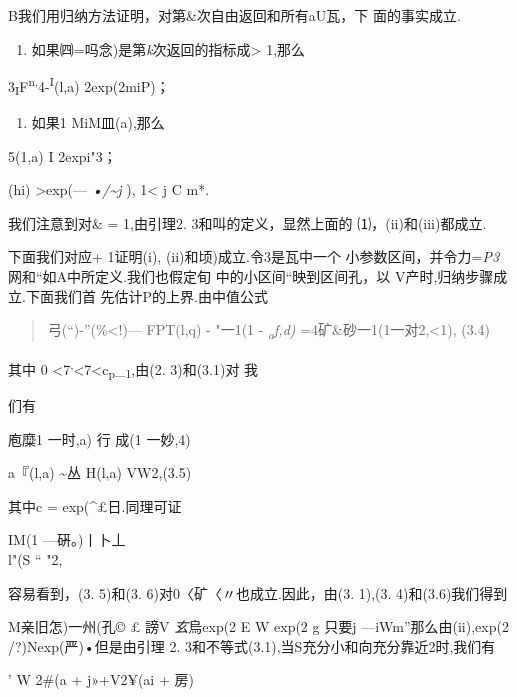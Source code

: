 \documentclass{article}
\begin{document}
B我们用归纳方法证明，对第\&次自由返回和所有aU瓦，下 面的事实成立.

\begin{enumerate}
\def\labelenumi{(\roman{enumi})}
\item
  如果㈣=吗念)是第\emph{k}次返回的指标成\textgreater{} 1,那么
\end{enumerate}

\textbar{}3\textsubscript{I}F\textsuperscript{n,}4-\textsuperscript{I}(l,a)\textbar{}
2exp(2miP)；

\begin{enumerate}
\def\labelenumi{(\roman{enumi})}
\setcounter{enumi}{1}
\item
  如果1 MiM皿(a),那么
\end{enumerate}

5(1,a) I 2expi"3；

(hi) \textgreater{}exp(--- \emph{•/\textasciitilde{}j} ), 1\textless{} j
C m*.

我们注意到对\& = 1,由引理2. 3和叫的定义，显然上面的
⑴，(ii)和(iii)都成立.

下面我们对应+ 1证明(i), (ii)和顷)成立.令3是瓦中一个
小参数区间，并令力=\emph{P3} 网和``如A中所定义.我们也假定旬
中的小区间``映到区间孔，以\textbar{} V产时,归纳步骤成立.下面我们首
先估计P的上界.由中值公式

\begin{quote}
弓(``)-''(\%\textless{}!)--- FPT(l,q) - "一1(1 -
\emph{\textsubscript{a}f,d)} =4矿\&砂一1(1一对2,\textless{}1), (3.4)
\end{quote}

其中 0
\textless{}7\textsuperscript{,}\textless{}7\textless{}c\textsubscript{p}\_\textsubscript{1},由(2.
3)和(3.1)对 我

们有

{庖糜1 一时,a)\textbar{}} 行 {成(1 一妙,4)\textbar{}}

\textbar{}a『(l,a)\textbar{} \textasciitilde{}丛
\textbar{}H(l,a)\textbar{} VW2,(3.5)

其中c = exp(\^{}£日.同理可证

{IM(1 ---硏。)丨}卜丄\\
l"(S `` "2,

容易看到，(3. 5)和(3. 6)对0〈矿〈〃也成立.因此，由(3. 1),(3.
4)和(3.6)我们得到

M亲旧怎)一州(孔©\textbar{} £ 謗V \emph{玄}烏exp(2 E W exp(2 g 只要j
---iWm''那么由(ii),exp(2 /?)Nexp(严)•但是由引理 2.
3和不等式(3.1),当S充分小和向充分靠近2时,我们有

' W 2\#(a + j»+V2¥(ai + 房)
\end{document}
